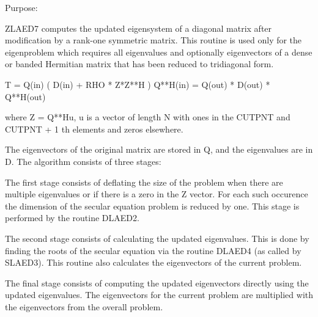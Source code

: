  \begin{DoxyParagraph}{Purpose\+: }
\begin{DoxyVerb} ZLAED7 computes the updated eigensystem of a diagonal
 matrix after modification by a rank-one symmetric matrix. This
 routine is used only for the eigenproblem which requires all
 eigenvalues and optionally eigenvectors of a dense or banded
 Hermitian matrix that has been reduced to tridiagonal form.

   T = Q(in) ( D(in) + RHO * Z*Z**H ) Q**H(in) = Q(out) * D(out) * Q**H(out)

   where Z = Q**Hu, u is a vector of length N with ones in the
   CUTPNT and CUTPNT + 1 th elements and zeros elsewhere.

    The eigenvectors of the original matrix are stored in Q, and the
    eigenvalues are in D.  The algorithm consists of three stages:

       The first stage consists of deflating the size of the problem
       when there are multiple eigenvalues or if there is a zero in
       the Z vector.  For each such occurence the dimension of the
       secular equation problem is reduced by one.  This stage is
       performed by the routine DLAED2.

       The second stage consists of calculating the updated
       eigenvalues. This is done by finding the roots of the secular
       equation via the routine DLAED4 (as called by SLAED3).
       This routine also calculates the eigenvectors of the current
       problem.

       The final stage consists of computing the updated eigenvectors
       directly using the updated eigenvalues.  The eigenvectors for
       the current problem are multiplied with the eigenvectors from
       the overall problem.\end{DoxyVerb}
 
\end{DoxyParagraph}

